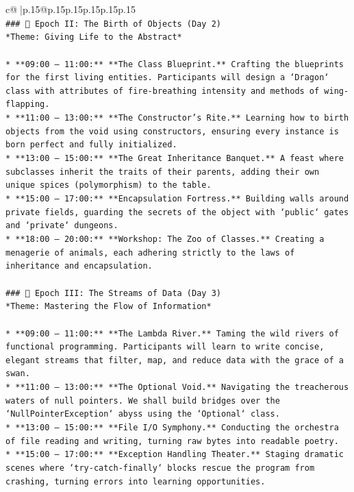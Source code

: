 \documentclass{article}
\begin{document}
{\begin{supertabular}{c@{$\;$}|p{.15\linewidth}@{}p{.15\linewidth}p{.15\linewidth}p{.15\linewidth}p{.15\linewidth}p{.15\linewidth}}
{{{\\ 
\texttt{\#\#\# 📅 Epoch II: The Birth of Objects (Day 2)} \\
\texttt{*Theme: Giving Life to the Abstract*} \\
\\ 
\texttt{*   **09:00 – 11:00:** **The Class Blueprint.** Crafting the blueprints for the first living entities. Participants will design a `Dragon` class with attributes of fire{-}breathing intensity and methods of wing{-}flapping.} \\
\texttt{*   **11:00 – 13:00:** **The Constructor's Rite.** Learning how to birth objects from the void using constructors, ensuring every instance is born perfect and fully initialized.} \\
\texttt{*   **13:00 – 15:00:** **The Great Inheritance Banquet.** A feast where subclasses inherit the traits of their parents, adding their own unique spices (polymorphism) to the table.} \\
\texttt{*   **15:00 – 17:00:** **Encapsulation Fortress.** Building walls around private fields, guarding the secrets of the object with `public` gates and `private` dungeons.} \\
\texttt{*   **18:00 – 20:00:** **Workshop: The Zoo of Classes.** Creating a menagerie of animals, each adhering strictly to the laws of inheritance and encapsulation.} \\
\\ 
\texttt{\#\#\# 📅 Epoch III: The Streams of Data (Day 3)} \\
\texttt{*Theme: Mastering the Flow of Information*} \\
\\ 
\texttt{*   **09:00 – 11:00:** **The Lambda River.** Taming the wild rivers of functional programming. Participants will learn to write concise, elegant streams that filter, map, and reduce data with the grace of a swan.} \\
\texttt{*   **11:00 – 13:00:** **The Optional Void.** Navigating the treacherous waters of null pointers. We shall build bridges over the `NullPointerException` abyss using the `Optional` class.} \\
\texttt{*   **13:00 – 15:00:** **File I/O Symphony.** Conducting the orchestra of file reading and writing, turning raw bytes into readable poetry.} \\
\texttt{*   **15:00 – 17:00:** **Exception Handling Theater.** Staging dramatic scenes where `try{-}catch{-}finally` blocks rescue the program from crashing, turning errors into learning opportunities.} \\
}}}
\end{supertabular}}
\end{document}
